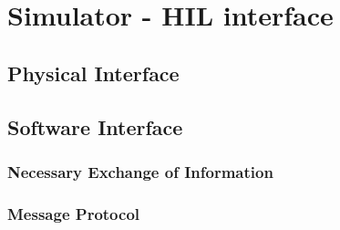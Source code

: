 \chapter{Simulator - HIL interface}

\section{Physical Interface}

\section{Software Interface}
\subsection{Necessary Exchange of Information}
\subsection{Message Protocol}



